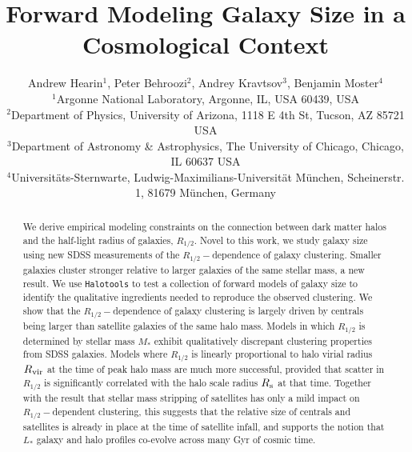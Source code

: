 \documentclass[usenatbib,usegraphicx,letterpaper]{mn2e}
\newcommand{\rhalf}{R_{1/2}}
\newcommand{\mstar}{M_{\ast}}
\newcommand{\rvir}{R_{\rm vir}}
\begin{document}
\title[Forward Modeling Galaxy Size]
{Forward Modeling Galaxy Size in a Cosmological Context}


\author[Hearin, Behroozi, Kravtsov \& Moster]{
Andrew Hearin$^{1}$, Peter Behroozi$^{2}$, Andrey Kravtsov$^{3}$, Benjamin Moster$^{4}$\\
$^{1}$Argonne National Laboratory, Argonne, IL, USA 60439, USA\\
$^{2}$Department of Physics, University of Arizona, 1118 E 4th St, Tucson, AZ 85721 USA\\
$^{3}$Department of Astronomy \& Astrophysics, The University of Chicago, Chicago, IL 60637 USA\\
$^{4}$Universit{\"a}ts-Sternwarte, Ludwig-Maximilians-Universit{\"a}t M{\"u}nchen, Scheinerstr. 1, 81679 M{\"u}nchen, Germany
}

\maketitle

\begin{abstract}
We derive empirical modeling constraints on the connection between dark matter halos and the half-light radius of galaxies, $\rhalf.$ Novel to this work, we study galaxy size using new SDSS measurements of the $\rhalf-$dependence of galaxy clustering. Smaller galaxies cluster stronger relative to larger galaxies of the same stellar mass, a new result. We use {\tt Halotools} to test a collection of forward models of galaxy size to identify the qualitative ingredients needed to reproduce the observed clustering. We show that the $\rhalf-$dependence of galaxy clustering is largely driven by centrals being larger than satellite galaxies of the same halo mass. Models in which $\rhalf$ is determined by stellar mass $\mstar$ exhibit qualitatively discrepant clustering properties from SDSS galaxies. Models where $\rhalf$ is linearly proportional to halo virial radius $\rvir$ at the time of peak halo mass are much more successful, provided that scatter in $\rhalf$ is significantly correlated with the halo scale radius $R_{\rm s}$ at that time. Together with the result that stellar mass stripping of satellites has only a mild impact on $\rhalf-$dependent clustering, this suggests that the relative size of centrals and satellites is already in place at the time of satellite infall, and supports the notion that $L_{\ast}$ galaxy and halo profiles co-evolve across many Gyr of cosmic time. 
\end{abstract}
\end{document}
